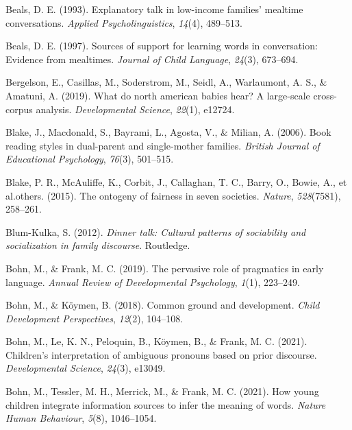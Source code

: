 \documentclass[
  man,floatsintext]{apa6}
\newlength{\cslhangindent}
\newlength{\cslentryspacingunit} %
\newenvironment{CSLReferences}[2] %
 {%
  \setlength{\parindent}{0pt}
  \ifodd #1
  \let\oldpar\par
  \def\par{\hangindent=\cslhangindent\oldpar}
  \fi
  \setlength{\parskip}{#2\cslentryspacingunit}
 }%
 {}
\begin{document}
\begin{CSLReferences}{1}{0}
\leavevmode{}%
Beals, D. E. (1993). Explanatory talk in low-income families' mealtime conversations. \emph{Applied Psycholinguistics}, \emph{14}(4), 489--513.

\leavevmode{}%
Beals, D. E. (1997). Sources of support for learning words in conversation: Evidence from mealtimes. \emph{Journal of Child Language}, \emph{24}(3), 673--694.

\leavevmode{}%
Bergelson, E., Casillas, M., Soderstrom, M., Seidl, A., Warlaumont, A. S., \& Amatuni, A. (2019). What do north american babies hear? A large-scale cross-corpus analysis. \emph{Developmental Science}, \emph{22}(1), e12724.

\leavevmode{}%
Blake, J., Macdonald, S., Bayrami, L., Agosta, V., \& Milian, A. (2006). Book reading styles in dual-parent and single-mother families. \emph{British Journal of Educational Psychology}, \emph{76}(3), 501--515.

\leavevmode{}%
Blake, P. R., McAuliffe, K., Corbit, J., Callaghan, T. C., Barry, O., Bowie, A., et al.others. (2015). The ontogeny of fairness in seven societies. \emph{Nature}, \emph{528}(7581), 258--261.

\leavevmode{}%
Blum-Kulka, S. (2012). \emph{Dinner talk: Cultural patterns of sociability and socialization in family discourse}. Routledge.

\leavevmode{}%
Bohn, M., \& Frank, M. C. (2019). The pervasive role of pragmatics in early language. \emph{Annual Review of Developmental Psychology}, \emph{1}(1), 223--249.

\leavevmode{}%
Bohn, M., \& Köymen, B. (2018). Common ground and development. \emph{Child Development Perspectives}, \emph{12}(2), 104--108.

\leavevmode{}%
Bohn, M., Le, K. N., Peloquin, B., Köymen, B., \& Frank, M. C. (2021). Children's interpretation of ambiguous pronouns based on prior discourse. \emph{Developmental Science}, \emph{24}(3), e13049.

\leavevmode{}%
Bohn, M., Tessler, M. H., Merrick, M., \& Frank, M. C. (2021). How young children integrate information sources to infer the meaning of words. \emph{Nature Human Behaviour}, \emph{5}(8), 1046--1054.


\end{CSLReferences}
\end{document}
